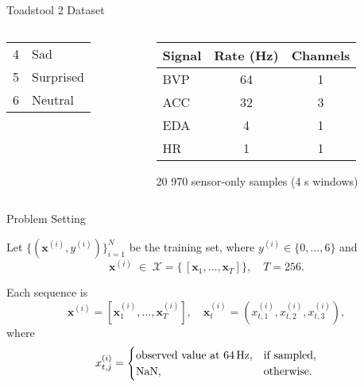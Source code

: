 \begin{frame}{Toadstool 2 Dataset}
\begin{columns}[T]
\begin{column}{0.5\textwidth}
\begin{center}
\begin{columns}[t]
	\centering\footnotesize
	\begin{tabular}{r l}
		4 & Sad        \\
		5 & Surprised  \\
		6 & Neutral
	\end{tabular}
\end{columns}


			\end{center}
			
		\end{column}
		\begin{column}{0.5\textwidth}
		\centering
		\small
		\begin{tabular}{lcc}
		\toprule
		\textbf{Signal} & \textbf{Rate (Hz)} & \textbf{Channels} \\
		\midrule
		BVP  & 64 & 1      \\
		ACC  & 32 & 3 		\\
		EDA  & 4  & 1      \\
		HR   & 1  & 1      \\
		\bottomrule
		\end{tabular}
		
		\begin{block}{}
			20 970 sensor‐only samples (4 s windows)
		\end{block}

		\end{column}
		
	\end{columns}
\end{frame}


\begin{frame}[t]{Problem Setting}
	\begin{block}
		Let $\{(\boldsymbol{x}^{(i)},y^{(i)})\}_{i=1}^N$ be the training set, where
		$y^{(i)}\in\{0,\dots,6\}$ and
		\[
		\boldsymbol{x}^{(i)} \;\in\; \mathcal{X}
		= \bigl\{\,[\boldsymbol{x}_1,\dots,\boldsymbol{x}_T]\bigr\},
		\quad T = 256.
		\]
	\end{block}
	\vspace{-0.5em}
	\begin{block}
		Each sequence is
		\[
		\boldsymbol{x}^{(i)}
		= [\boldsymbol{x}_1^{(i)}, \dots, \boldsymbol{x}_T^{(i)}],
		\quad
		\boldsymbol{x}_t^{(i)} = (x_{t,1}^{(i)}, x_{t,2}^{(i)}, x_{t,3}^{(i)}),
		\]
		where 
		\[
		x_{t,j}^{(i)} =
		\begin{cases}
			\text{observed value at 64\,Hz}, & \text{if sampled},\\
			\mathrm{NaN},                    & \text{otherwise}.
		\end{cases}
		\]
	\end{block}
\end{frame}

